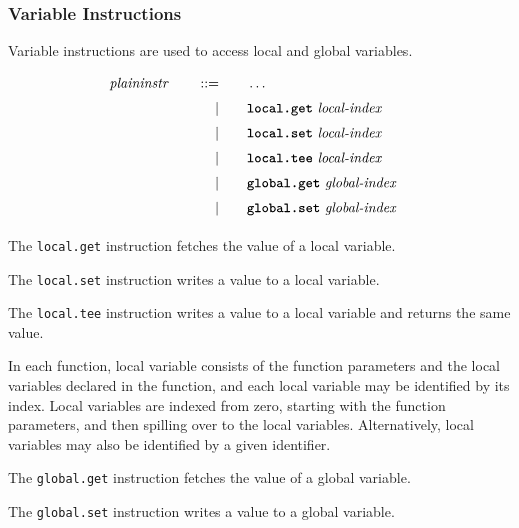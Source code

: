 \subsubsection{Variable Instructions}

Variable instructions are used to access local and global variables.

\begin{alignat*}{9}
    && \textit{plaininstr}\ &&\quad ::= &\quad && \dots \quad &&  \\[1mm]
    &&       &&\quad | &\quad && \textbf{\texttt{local.get}}\ \textit{local-index}\quad &&  \\[1mm]
    &&       &&\quad | &\quad && \textbf{\texttt{local.set}}\ \textit{local-index}\quad &&  \\[1mm]
    &&       &&\quad | &\quad && \textbf{\texttt{local.tee}}\ \textit{local-index}\quad &&  \\[1mm]
    &&       &&\quad | &\quad && \textbf{\texttt{global.get}}\ \textit{global-index}\quad &&  \\[1mm]
    &&       &&\quad | &\quad && \textbf{\texttt{global.set}}\ \textit{global-index}\quad &&  \\[1mm]
\end{alignat*}

The \texttt{local.get} instruction fetches the value of a local variable. \vspace{1em}

The \texttt{local.set} instruction writes a value to a local variable. \vspace{1em}

The \texttt{local.tee} instruction writes a value to a local variable and returns the same value. \vspace{1em}

In each function, local variable consists of the function parameters and the local variables declared in the function, and each local variable may be identified by its index. 
Local variables are indexed from zero, starting with the function parameters, and then spilling over to the local variables. Alternatively, local variables may also be identified by a given identifier. \vspace{1em}

The \texttt{global.get} instruction fetches the value of a global variable. \vspace{1em}

The \texttt{global.set} instruction writes a value to a global variable. \vspace{1em}

